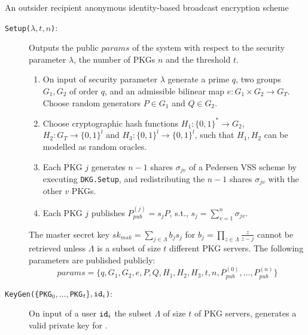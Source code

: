 \begin{algorithm}[H]
\caption{An outsider recipient anonymous identity-based broadcast encryption scheme}
\label{alg:our_scheme}

\begin{description}
    \item[\texttt{Setup($\lambda, t, n$)}:] Outputs the public $params$ of the system with respect to the security parameter $\lambda$, the number of PKGs $n$ and the threshold $t$.
    \begin{enumerate}
        \item On input of security parameter $\lambda$ generate a prime $q$, two groups $G_1, G_2$ of order $q$, and an admissible bilinear map $e: G_1 \times G_2 \rightarrow G_T$. Choose random generators $P \in G_1$ and $Q \in G_2$. 
    
        \item Choose cryptographic hash functions $H_1: \{ 0,1 \}^{*} \rightarrow G_2$, ${H_2: G_T \rightarrow \{ 0,1 \}^{l}}$ and $H_3: \{ 0, 1 \}^{l} \rightarrow \{ 0,1 \}^{l}$, such that $H_1, H_2$ can be modelled as random oracles.
        
        \item Each PKG $j$ generates $n-1$ shares $\sigma_{jv}$ of a Pedersen VSS scheme by executing \texttt{DKG.Setup}, and redistributing the $n-1$ shares $\sigma_{jv}$ with the other $v$ PKGs.

        \item Each PKG $j$ publishes $P_{pub}^{(j)} = s_j P$, s.t., $s_j=\sum_{v=1}^n \sigma_{jv}$.
    \end{enumerate}
    
    The master secret key $sk_{msk} = \sum_{j \in \Lambda} b_j s_j$ for $b_j = \prod_{z \in \Lambda} \frac{z}{z-j}$ cannot be retrieved unless $\Lambda$ is a subset of size $t$ different PKG servers. The following parameters are published publicly:
    \begin{equation*}
    params = \{ q, G_1, G_2, e, P, Q, H_1, H_2, H_3, t, n, P_{pub}^{(0)}, \ldots, P_{pub}^{(n)} \}
    \end{equation*}

    \item[\texttt{KeyGen(\{PKG$_0,\ldots,$PKG$_t\}, \mathtt{id}_{i}$)}:] On input of a user $\mathtt{id}_{i}$ the subset $\Lambda$ of size $t$ of PKG servers, generates a valid private key for . 
    

\end{description}
\end{algorithm}
